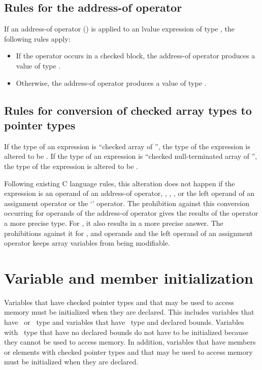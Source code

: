 \subsection{Rules for the address-of operator}

If an address-of operator (\code{&}) is applied to an lvalue expression
of type , the following rules apply:

\begin{itemize}
\item
  If the operator occurs in a checked block, the address-of operator
  produces a value of type \arrayptrT.
\item
  Otherwise, the address-of operator produces a value of type 
  \code{*}.
\end{itemize}

\subsection{Rules for conversion of checked array types to pointer types}
\label{section:array-to-pointer-conversion}

If the type of an expression is ``checked array of
'', the type of the expression is altered to be
\arrayptrT.  If the type of an expression is ``checked null-terminated
array of '', the type of the expression is altered to
be \ntarrayptrT.

Following existing C language rules, this alteration does not happen if
the expression is an operand of an address-of operator, \code{++},
\code{--}, , or the left operand of an assignment
operator or the `' operator. The prohibition against this
conversion occurring for operands of the address-of operator gives the
results of the operator a more precise type. For , it also results
in a more precise answer. The prohibitions against it for \code{++}, and
\code{--} operands and the left operand of an assignment operator keeps array
variables from being modifiable.

\section{Variable and member initialization}

Variables that have checked pointer types and that may be used to access memory
must be initialized when they are declared.   This includes variables that have \ptr\ or
\ntarrayptr\ type and variables that have \arrayptr\ type and declared bounds.
Variables with \arrayptr\ type that have no declared bounds do not have to be initialized
because they cannot be used to access memory.   In addition, variables that have members
or elements with checked pointer types and that may be used to access memory must be
initialized when they are declared.

